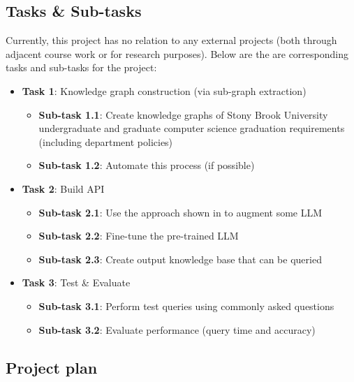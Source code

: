 \documentclass[12pt]{article}
\begin{document}
    \subsection{Tasks \& Sub-tasks}
    \label{subsec:tasks}
    Currently, this project has no relation to any external projects (both through adjacent course work or for research purposes). Below are the are corresponding tasks and sub-tasks for the project:

    \begin{itemize}
        \item \textbf{Task 1}: Knowledge graph construction (via sub-graph extraction\cite{He-WSDM-2021})
        \begin{itemize}
            \item \textbf{Sub-task 1.1}: Create knowledge graphs of Stony Brook University undergraduate and graduate computer science graduation requirements (including department policies)
            \item \textbf{Sub-task 1.2}: Automate this process (if possible)
        \end{itemize}
        \item \textbf{Task 2}: Build API
        \begin{itemize}
            \item \textbf{Sub-task 2.1}: Use the approach shown in \cite{luo2024} to augment some LLM \cite{alpaca,touvron2023llama,touvron2023llama2,ye2023gpt3.5}
            \item \textbf{Sub-task 2.2}: Fine-tune the pre-trained LLM
            \item \textbf{Sub-task 2.3}: Create output knowledge base that can be queried
        \end{itemize}
        \item \textbf{Task 3}: Test \& Evaluate
        \begin{itemize}
            \item \textbf{Sub-task 3.1}: Perform test queries using commonly asked questions
            \item \textbf{Sub-task 3.2}: Evaluate performance (query time and accuracy)
        \end{itemize}
    \end{itemize}

    \subsection{Project plan} 
    \label{subsec:plan}
    
\end{document}
